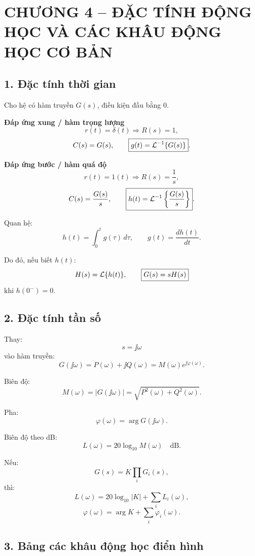 \clearpage
\section*{CHƯƠNG 4 -- ĐẶC TÍNH ĐỘNG HỌC VÀ CÁC KHÂU ĐỘNG HỌC CƠ BẢN}

\subsection*{1. Đặc tính thời gian}

Cho hệ có hàm truyền $G(s)$, điều kiện đầu bằng $0$.

\textbf{Đáp ứng xung / hàm trọng lượng}
\[
r(t)=\delta(t)\Longrightarrow R(s)=1,
\]
\[
C(s)=G(s),
\qquad
\boxed{g(t)=\mathcal{L}^{-1}\{G(s)\}}.
\]

\textbf{Đáp ứng bước / hàm quá độ}
\[
r(t)=1(t)\Longrightarrow R(s)=\frac1s,
\]
\[
C(s)=\frac{G(s)}s,
\qquad
\boxed{h(t)=\mathcal{L}^{-1}\left\{\frac{G(s)}s\right\}}.
\]

Quan hệ:
\[
\boxed{
h(t)=\int_0^t g(\tau)\,d\tau,
\qquad
g(t)=\frac{dh(t)}{dt}.
}
\]

Do đó, nếu biết $h(t)$:
\[
H(s)=\mathcal{L}\{h(t)\},
\qquad
\boxed{G(s)=sH(s)}
\]
khi $h(0^-)=0$.

\subsection*{2. Đặc tính tần số}

Thay:
\[
s=\jj\omega
\]
vào hàm truyền:
\[
\boxed{
G(\jj\omega)
=
P(\omega)+\jj Q(\omega)
=
M(\omega)e^{\jj\varphi(\omega)}.
}
\]

Biên độ:
\[
\boxed{
M(\omega)=|G(\jj\omega)|
=\sqrt{P^2(\omega)+Q^2(\omega)}.
}
\]

Pha:
\[
\boxed{
\varphi(\omega)=\arg G(\jj\omega).
}
\]

Biên độ theo dB:
\[
\boxed{
L(\omega)=20\log_{10}M(\omega)\quad\text{dB}.
}
\]

Nếu:
\[
G(s)=K\prod_iG_i(s),
\]
thì:
\[
L(\omega)=20\log_{10}|K|+\sum_iL_i(\omega),
\]
\[
\varphi(\omega)=\arg K+\sum_i\varphi_i(\omega).
\]

\subsection*{3. Bảng các khâu động học điển hình}

